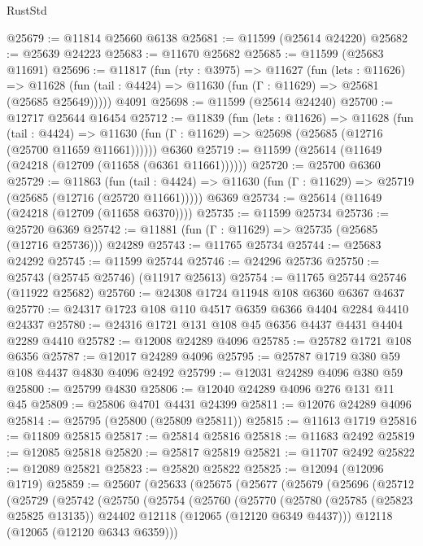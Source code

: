 \begin{lexlean}{RustStd}
\begin{coremodule}
@25679 := @11814 @25660 @6138
@25681 := @11599 (@25614 @24220)
@25682 := @25639 @24223
@25683 := @11670 @25682
@25685 := @11599 (@25683 @11691)
@25696 := @11817
    (fun (rty : @3975) =>
    @11627
      (fun (lets : @11626) =>
      @11628 (fun (tail : @4424) => @11630 (fun (Γ : @11629) => @25681 (@25685 @25649)))))
    @4091
@25698 := @11599 (@25614 @24240)
@25700 := @12717 @25644 @16454
@25712 := @11839
    (fun (lets : @11626) =>
    @11628
      (fun (tail : @4424) =>
      @11630 (fun (Γ : @11629) => @25698 (@25685 (@12716 (@25700 @11659 @11661))))))
    @6360
@25719 := @11599 (@25614 (@11649 (@24218 (@12709 (@11658 (@6361 @11661))))))
@25720 := @25700 @6360
@25729 := @11863
    (fun (tail : @4424) => @11630 (fun (Γ : @11629) => @25719 (@25685 (@12716 (@25720 @11661)))))
    @6369
@25734 := @25614 (@11649 (@24218 (@12709 (@11658 @6370))))
@25735 := @11599 @25734
@25736 := @25720 @6369
@25742 := @11881 (fun (Γ : @11629) => @25735 (@25685 (@12716 @25736))) @24289
@25743 := @11765 @25734
@25744 := @25683 @24292
@25745 := @11599 @25744
@25746 := @24296 @25736
@25750 := @25743 (@25745 @25746) (@11917 @25613)
@25754 := @11765 @25744 @25746 (@11922 @25682)
@25760 := @24308 @1724 @11948 @108 @6360 @6367 @4637
@25770 := @24317 @1723 @108 @110 @4517 @6359 @6366 @4404 @2284 @4410 @24337
@25780 := @24316 @1721 @131 @108 @45 @6356 @4437 @4431 @4404 @2289 @4410
@25782 := @12008 @24289 @4096
@25785 := @25782 @1721 @108 @6356
@25787 := @12017 @24289 @4096
@25795 := @25787 @1719 @380 @59 @108 @4437 @4830 @4096 @2492
@25799 := @12031 @24289 @4096 @380 @59
@25800 := @25799 @4830
@25806 := @12040 @24289 @4096 @276 @131 @11 @45
@25809 := @25806 @4701 @4431 @24399
@25811 := @12076 @24289 @4096
@25814 := @25795 (@25800 (@25809 @25811))
@25815 := @11613 @1719
@25816 := @11809 @25815
@25817 := @25814 @25816
@25818 := @11683 @2492
@25819 := @12085 @25818
@25820 := @25817 @25819
@25821 := @11707 @2492
@25822 := @12089 @25821
@25823 := @25820 @25822
@25825 := @12094 (@12096 @1719)
@25859 := @25607
    (@25633
      (@25675
        (@25677
          (@25679
            (@25696
              (@25712
                (@25729
                  (@25742
                    (@25750
                      (@25754
                        (@25760
                          (@25770
                            (@25780
                              (@25785 (@25823 @25825 @13135))
                              @24402
                              @12118
                              (@12065 (@12120 @6349 @4437)))
                            @12118
                            (@12065 (@12120 @6343 @6359)))

\end{coremodule}
\end{lexlean}
